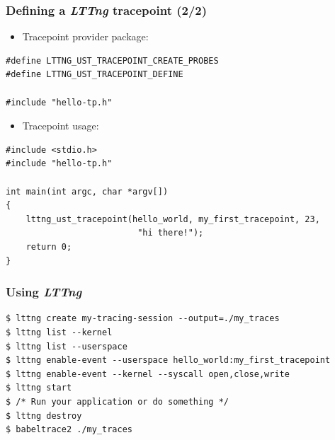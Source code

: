 \begin{frame}[fragile]
  \frametitle{Defining a {\em LTTng} tracepoint (2/2)}
  \begin{itemize}
    \item Tracepoint provider package:
  \end{itemize}
  \begin{block}{}
    \begin{verbatim}
#define LTTNG_UST_TRACEPOINT_CREATE_PROBES
#define LTTNG_UST_TRACEPOINT_DEFINE

#include "hello-tp.h"
   \end{verbatim}
  \end{block}

  \begin{itemize}
    \item Tracepoint usage:
  \end{itemize}
  \begin{block}{}
    \begin{verbatim}
#include <stdio.h>
#include "hello-tp.h"

int main(int argc, char *argv[])
{
    lttng_ust_tracepoint(hello_world, my_first_tracepoint, 23,
                          "hi there!");
    return 0;
}
   \end{verbatim}
  \end{block}
\end{frame}

\begin{frame}[fragile]
  \frametitle{Using {\em LTTng}}
  \begin{block}{}
    \begin{verbatim}
$ lttng create my-tracing-session --output=./my_traces
$ lttng list --kernel
$ lttng list --userspace
$ lttng enable-event --userspace hello_world:my_first_tracepoint
$ lttng enable-event --kernel --syscall open,close,write
$ lttng start
$ /* Run your application or do something */
$ lttng destroy
$ babeltrace2 ./my_traces
   \end{verbatim}
  \end{block}
\end{frame}

